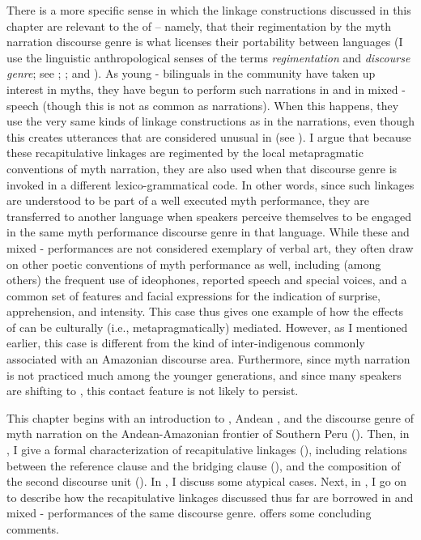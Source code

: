\documentclass[output=paper]{LSP/langsci}
\begin{document}
There is a more specific sense in which the  linkage constructions discussed in this chapter are relevant to the  of  – namely, that their regimentation by the myth narration discourse genre is what licenses their portability between languages (I use the linguistic anthropological senses of the terms \textit{regimentation} and \textit{discourse genre}; see \citealt{briggs.1992}; \citealt{silverstein93}; and ). As young - bilinguals in the community have taken up interest in myths, they have begun to perform such narrations in  and in mixed - speech (though this is not as common as  narrations). When this happens, they use the very same kinds of linkage constructions as in the  narrations, even though this creates utterances that are considered unusual in  (see ). I argue that because these recapitulative linkages are regimented by the local metapragmatic conventions of myth narration, they are also used when that discourse genre is invoked in a different lexico-grammatical code. In other words, since such linkages are understood to be part of a well executed myth performance, they are transferred to another language when speakers perceive themselves to be engaged in the same myth performance discourse genre in that language. While these  and mixed - performances are not considered exemplary of  verbal art, they often draw on other poetic conventions of  myth performance as well, including (among others) the frequent use of ideophones, reported speech and special voices, and a common set of  features and facial expressions for the indication of surprise, apprehension, and intensity. This case thus gives one example of how the effects of  can be culturally (i.e., metapragmatically) mediated. However, as I mentioned earlier, this case is different from the kind of inter-indigenous  commonly associated with an Amazonian discourse area. Furthermore, since myth narration is not practiced much among the younger generations, and since many  speakers are shifting to , this contact feature is not likely to persist.
 
This chapter begins with an introduction to , Andean , and the discourse genre of myth narration on the Andean-Amazonian frontier of Southern Peru (). Then, in , I give a formal characterization of recapitulative linkages (), including relations between the reference clause and the bridging clause (), and the composition of the second discourse unit (). In , I discuss some atypical cases. Next, in , I go on to describe how the  recapitulative linkages discussed thus far are borrowed in  and mixed - performances of the same discourse genre.  offers some concluding comments.
%
\end{document}
